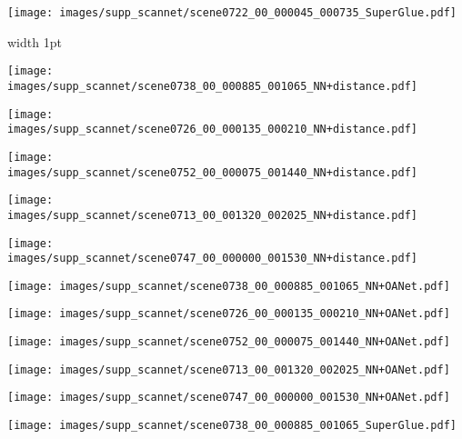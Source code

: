 \documentclass[10pt,twocolumn,letterpaper]{article}
\renewcommand{\*}[1]{\mathbf{#1}}
\newcommand{\0}{\phantom{0}}
\begin{document}
\begin{figure*}[ht!]
\begin{minipage}{\iwidth\textwidth}
    \vspace{.5mm}
    \texttt{[image: images/supp\_scannet/scene0722\_00\_000045\_000735\_SuperGlue.pdf]}
\end{minipage}

\vspace{1.5mm}
\begin{minipage}{0.02\textwidth}
\end{minipage}\hfill{\vline width 1pt}\hfill
\hspace{1mm}\begin{minipage}{\iwidth\textwidth}
    \texttt{[image: images/supp\_scannet/scene0738\_00\_000885\_001065\_NN+distance.pdf]}
    
    \vspace{.5mm}
    \texttt{[image: images/supp\_scannet/scene0726\_00\_000135\_000210\_NN+distance.pdf]}
    
    \vspace{.5mm}
    \texttt{[image: images/supp\_scannet/scene0752\_00\_000075\_001440\_NN+distance.pdf]}
    
    \vspace{.5mm}
    \texttt{[image: images/supp\_scannet/scene0713\_00\_001320\_002025\_NN+distance.pdf]}
    
    \vspace{.5mm}
    \texttt{[image: images/supp\_scannet/scene0747\_00\_000000\_001530\_NN+distance.pdf]}
\end{minipage}\hspace{1mm}\begin{minipage}{\iwidth\textwidth}
    \texttt{[image: images/supp\_scannet/scene0738\_00\_000885\_001065\_NN+OANet.pdf]}
    
    \vspace{.5mm}
    \texttt{[image: images/supp\_scannet/scene0726\_00\_000135\_000210\_NN+OANet.pdf]}
    
    \vspace{.5mm}
    \texttt{[image: images/supp\_scannet/scene0752\_00\_000075\_001440\_NN+OANet.pdf]}

    \vspace{.5mm}
    \texttt{[image: images/supp\_scannet/scene0713\_00\_001320\_002025\_NN+OANet.pdf]}
    
    \vspace{.5mm}
    \texttt{[image: images/supp\_scannet/scene0747\_00\_000000\_001530\_NN+OANet.pdf]}
\end{minipage}\hspace{1mm}\begin{minipage}{\iwidth\textwidth}
    \texttt{[image: images/supp\_scannet/scene0738\_00\_000885\_001065\_SuperGlue.pdf]}
    

\end{minipage}
\end{figure*}
\end{document}
